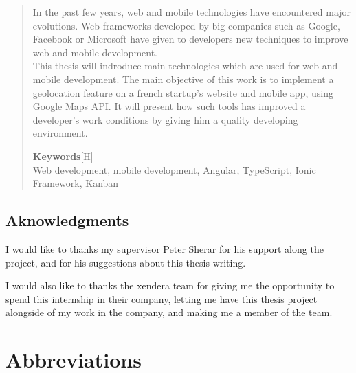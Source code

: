 \documentclass{article}
\begin{document}
        \begin{abstract}
            In the past few years, web and mobile technologies have encountered major evolutions. Web frameworks developed by big companies such
            as Google, Facebook or Microsoft have given to developers new techniques to improve web and mobile development.\\
            This thesis will indroduce main technologies which are used for web and mobile development. The main objective of this work
            is to implement a geolocation feature on a french startup's website and mobile app, using Google Maps API. It will present how
            such tools has improved a developer's work conditions by giving him a quality developing environment.

            
                        \textbf{Keywords}[H]\\
                        Web development, mobile development, Angular, TypeScript, Ionic Framework, Kanban
        \end{abstract}

        \newpage
        \begin{center}
        \section*{Aknowledgments}
        \end{center}
            \vspace{1cm}

            I would like to thanks my supervisor Peter Sherar for his support along the project, and for his suggestions about this thesis writing.

            \vspace{1cm}

            I would also like to thanks the xendera team for giving me the opportunity to spend this internship in their company,
            letting me have this thesis project alongside of my work in the company, and making me a member of the team.

        \newpage
        \tableofcontents
    
        \newpage
        \listoffigures
    
        \listoftables
    
        \newpage
        \section*{Abbreviations}
\end{document}
